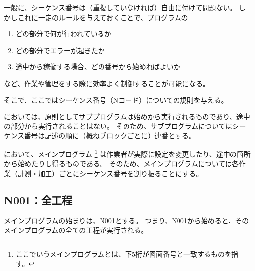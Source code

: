 


一般に、シーケンス番号は（重複していなければ）自由に付けて問題ない。
しかしこれに一定のルールを与えておくことで、プログラムの
\begin{enumerate}
\item どの部分で何が行われているか
\item どの部分でエラーが起きたか
\item 途中から稼働する場合、どの番号から始めればよいか
\end{enumerate}
など、作業や管理をする際に効率よく制御することが可能になる。

そこで、ここではシーケンス番号（Nコード）についての規則を与える。


\DMname においては、原則としてサブプログラムは始めから実行されるものであり、途中の部分から実行されることはない。
そのため、サブプログラムについてはシーケンス番号は記述の順に（概ねブロックごとに）連番とする。


\DMname において、メインプログラム
\footnote{ここでいうメインプログラムとは、下5桁が図面番号と一致するものを指す。}
は作業者が実際に設定を変更したり、途中の箇所から始めたりし得るものである。
そのため、メインプログラムについては各作業（計測・加工）ごとにシーケンス番号を割り振ることにする。


\subsection{N001：全工程}
メインプログラムの始まりは、N001とする。
つまり、N001から始めると、そのメインプログラムの全ての工程が実行される。


